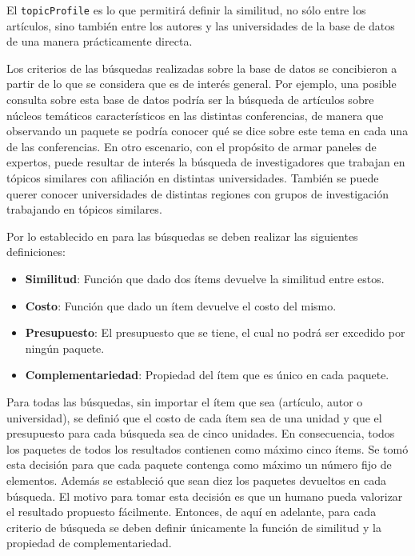 El \texttt{topicProfile} es lo que permitirá definir la similitud, no sólo entre los artículos, sino también entre los autores y las universidades de la base de datos de una manera prácticamente directa.

Los criterios de las búsquedas realizadas sobre la base de datos se concibieron a partir de lo que se considera que es de interés general. Por ejemplo, una posible consulta sobre esta base de datos podría ser la búsqueda de artículos sobre núcleos temáticos característicos en las distintas conferencias, de manera que observando un paquete se podría conocer qué se dice sobre este tema en cada una de las conferencias. En otro escenario, con el propósito de armar paneles de expertos, puede resultar de interés la búsqueda de investigadores que trabajan en tópicos similares con afiliación en distintas universidades. También se puede querer conocer universidades de distintas regiones con grupos de investigación trabajando en tópicos similares.

Por lo establecido en \cite{journals/tkde/Amer-YahiaBCFMZ14} para las búsquedas se deben realizar las siguientes definiciones:
\begin{itemize}
  \item \textbf{Similitud}: Función que dado dos ítems devuelve la similitud entre estos.
  \item \textbf{Costo}: Función que dado un ítem devuelve el costo del mismo.
  \item \textbf{Presupuesto}: El presupuesto que se tiene, el cual no podrá ser excedido por ningún paquete.
  \item \textbf{Complementariedad}: Propiedad del ítem que es único en cada paquete.
\end{itemize}

Para todas las búsquedas, sin importar el ítem que sea (artículo, autor o universidad), se definió que el costo de cada ítem sea de una unidad y que el presupuesto para cada búsqueda sea de cinco unidades. En consecuencia, todos los paquetes de todos los resultados contienen como máximo cinco ítems. Se tomó esta decisión para que cada paquete contenga como máximo un número fijo de elementos. Además se estableció que sean diez los paquetes devueltos en cada búsqueda. El motivo para tomar esta decisión es que un humano pueda valorizar el resultado propuesto fácilmente. Entonces, de aquí en adelante, para cada criterio de búsqueda se deben definir únicamente la función de similitud y la propiedad de complementariedad.

